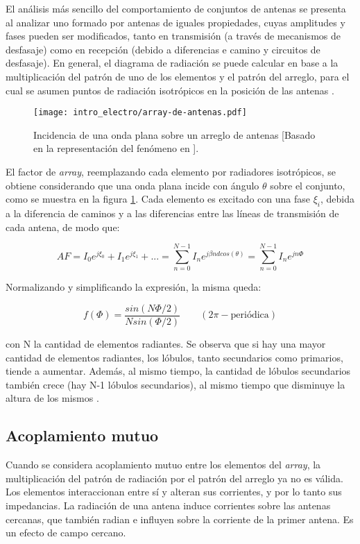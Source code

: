 El análisis más sencillo del comportamiento de conjuntos de antenas se presenta al analizar uno formado por antenas de iguales propiedades, cuyas amplitudes y fases pueden ser modificados, tanto en transmisión (a través de mecanismos de desfasaje) como en recepción (debido a diferencias e camino y circuitos de desfasaje). En general, el diagrama de radiación se puede calcular en base a la multiplicación del patrón de uno de los elementos y el patrón del arreglo, para el cual se asumen puntos de radiación isotrópicos en la posición de las antenas \cite{Balanis:Theory}.

\begin{figure}[htp]
	\centering
	\texttt{[image: intro\_electro/array-de-antenas.pdf]}
	\caption{Incidencia de una onda plana sobre un arreglo de antenas [Basado en la representación del fenómeno en \cite{Balanis:Theory}].}
	\label{fig:rayosincidentes-array}
\end{figure}

El factor de \textit{array}, reemplazando cada elemento por radiadores isotrópicos, se obtiene considerando que una onda plana incide con ángulo $\theta$ sobre el conjunto, como se muestra en la figura \ref{fig:rayosincidentes-array}. Cada elemento es excitado con una fase $\xi_i$, debida a la diferencia de caminos y a las diferencias entre las líneas de transmisión de cada antena, de modo que:

\begin{equation}
AF=I_0e^{j\xi_0} + I_1e^{j\xi_1} + ... = \sum_{n=0}^{N-1} I_n e^{j\beta n d cos(\theta)}=\sum_{n=0}^{N-1} I_n e^{jn\Phi}
\end{equation}

Normalizando y simplificando la expresión, la misma queda:

\begin{equation}
	f(\Phi) = \frac{sin(N\Phi/2)}{N sin(\Phi/2)} \qquad (2\pi-\text{periódica})
\end{equation}

con N la cantidad de elementos radiantes. Se observa que si hay una mayor cantidad de elementos radiantes, los lóbulos, tanto secundarios como primarios, tiende a aumentar. Además, al mismo tiempo, la cantidad de lóbulos secundarios también crece (hay N-1 lóbulos secundarios), al mismo tiempo que disminuye la altura de los mismos \cite{Stutzman:AntennaTheory}.

\subsection{Acoplamiento mutuo}
\label{subsec_acoplamiento}
Cuando se considera acoplamiento mutuo entre los elementos del \textit{array}, la multiplicación del patrón de radiación por el patrón del arreglo ya no es válida. Los elementos interaccionan entre sí y alteran sus corrientes, y por lo tanto sus impedancias. La radiación de una antena induce corrientes sobre las antenas cercanas, que también radian e influyen sobre la corriente de la primer antena. Es un efecto de campo cercano.

